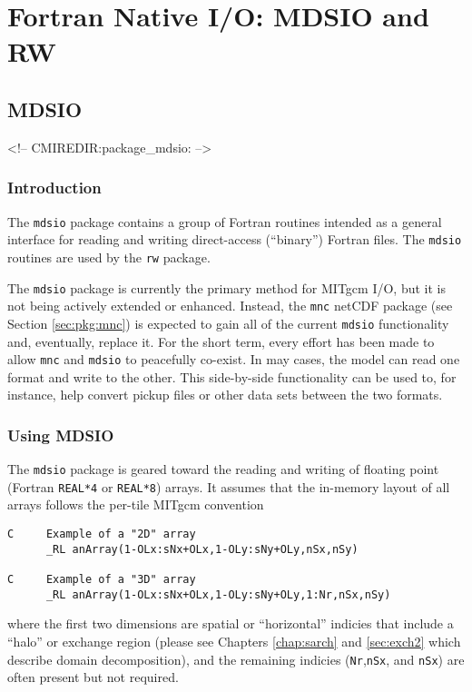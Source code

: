 

\section{Fortran Native I/O: MDSIO and RW}
\label{sec:mdsio_and_rw}


\subsection{MDSIO}
\label{sec:pkg:mdsio}
\begin{rawhtml}
<!-- CMIREDIR:package_mdsio: -->
\end{rawhtml}
\label{sec:pkg:rw}

\subsubsection{Introduction}
The \texttt{mdsio} package contains a group of Fortran routines
intended as a general interface for reading and writing direct-access
(``binary'') Fortran files.  The \texttt{mdsio} routines are used by
the \texttt{rw} package.

The \texttt{mdsio} package is currently the primary method for MITgcm
I/O, but it is not being actively extended or enhanced.  Instead, the
\texttt{mnc} netCDF package (see Section \ref{sec:pkg:mnc}) is
expected to gain all of the current \texttt{mdsio} functionality and,
eventually, replace it.  For the short term, every effort has been
made to allow \texttt{mnc} and \texttt{mdsio} to peacefully co-exist.
In may cases, the model can read one format and write to the other.
This side-by-side functionality can be used to, for instance, help
convert pickup files or other data sets between the two formats.


\subsubsection{Using MDSIO}
The \texttt{mdsio} package is geared toward the reading and writing of
floating point (Fortran \texttt{REAL*4} or \texttt{REAL*8}) arrays.
It assumes that the in-memory layout of all arrays follows the per-tile
MITgcm convention
\begin{verbatim}
C     Example of a "2D" array
      _RL anArray(1-OLx:sNx+OLx,1-OLy:sNy+OLy,nSx,nSy)

C     Example of a "3D" array
      _RL anArray(1-OLx:sNx+OLx,1-OLy:sNy+OLy,1:Nr,nSx,nSy)
\end{verbatim}
where the first two dimensions are spatial or ``horizontal'' indicies
that include a ``halo'' or exchange region (please see
Chapters \ref{chap:sarch} and \ref{sec:exch2} which describe domain
decomposition), and the remaining indicies (\texttt{Nr},\texttt{nSx},
and \texttt{nSx}) are often present but not required.

